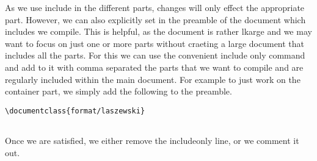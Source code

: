As we use include in the different parts, changes will only effect the
appropriate part. However, we can also explicitly set in the preamble
of the document which includes we compile. This is helpful, as the
document is rather lkarge and we may want to focus on just one or more
parts without craeting a large document that includes all the parts.
For this we can use the convenient include only command and add to it
with comma separated the parts that we want to compile and are
regularly included within the main document. For example to just work
on the container part, we simply add the following to the preamble.

\begin{verbatim}
\documentclass{format/laszewski} 


\end{verbatim}

Once we are satisfied, we either remove the includeonly line, or we
comment it out.